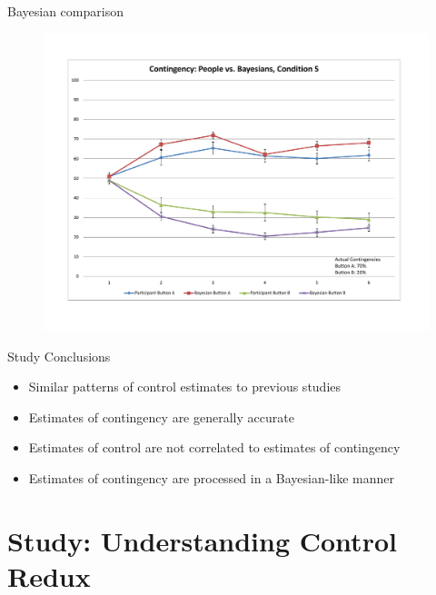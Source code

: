 \documentclass{beamer}
\begin{document}
\begin{frame}{Bayesian comparison}
	\begin{figure}
	\begin{center}
		\includegraphics[width=\linewidth]{learning5}
	\end{center}
	\end{figure}
\end{frame}

\begin{frame}{Study Conclusions}
\begin{itemize}
	\item Similar patterns of control estimates to previous studies
	\item Estimates of contingency are generally accurate
	\item Estimates of control are not correlated to estimates of contingency
	\item Estimates of contingency are processed in a Bayesian-like manner
\end{itemize}
\end{frame}

\section{Study: Understanding Control Redux}
\end{document}
